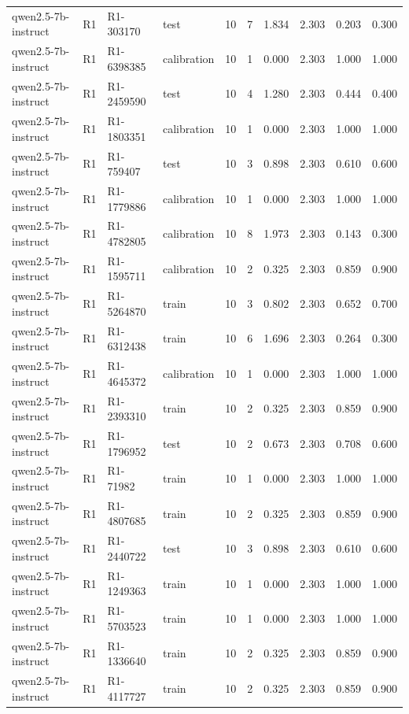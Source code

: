 \begin{table}
\begin{tabular}{llllrrrrrr}
qwen2.5-7b-instruct & R1 & R1-303170 & test & 10 & 7 & 1.834 & 2.303 & 0.203 & 0.300 \\
qwen2.5-7b-instruct & R1 & R1-6398385 & calibration & 10 & 1 & 0.000 & 2.303 & 1.000 & 1.000 \\
qwen2.5-7b-instruct & R1 & R1-2459590 & test & 10 & 4 & 1.280 & 2.303 & 0.444 & 0.400 \\
qwen2.5-7b-instruct & R1 & R1-1803351 & calibration & 10 & 1 & 0.000 & 2.303 & 1.000 & 1.000 \\
qwen2.5-7b-instruct & R1 & R1-759407 & test & 10 & 3 & 0.898 & 2.303 & 0.610 & 0.600 \\
qwen2.5-7b-instruct & R1 & R1-1779886 & calibration & 10 & 1 & 0.000 & 2.303 & 1.000 & 1.000 \\
qwen2.5-7b-instruct & R1 & R1-4782805 & calibration & 10 & 8 & 1.973 & 2.303 & 0.143 & 0.300 \\
qwen2.5-7b-instruct & R1 & R1-1595711 & calibration & 10 & 2 & 0.325 & 2.303 & 0.859 & 0.900 \\
qwen2.5-7b-instruct & R1 & R1-5264870 & train & 10 & 3 & 0.802 & 2.303 & 0.652 & 0.700 \\
qwen2.5-7b-instruct & R1 & R1-6312438 & train & 10 & 6 & 1.696 & 2.303 & 0.264 & 0.300 \\
qwen2.5-7b-instruct & R1 & R1-4645372 & calibration & 10 & 1 & 0.000 & 2.303 & 1.000 & 1.000 \\
qwen2.5-7b-instruct & R1 & R1-2393310 & train & 10 & 2 & 0.325 & 2.303 & 0.859 & 0.900 \\
qwen2.5-7b-instruct & R1 & R1-1796952 & test & 10 & 2 & 0.673 & 2.303 & 0.708 & 0.600 \\
qwen2.5-7b-instruct & R1 & R1-71982 & train & 10 & 1 & 0.000 & 2.303 & 1.000 & 1.000 \\
qwen2.5-7b-instruct & R1 & R1-4807685 & train & 10 & 2 & 0.325 & 2.303 & 0.859 & 0.900 \\
qwen2.5-7b-instruct & R1 & R1-2440722 & test & 10 & 3 & 0.898 & 2.303 & 0.610 & 0.600 \\
qwen2.5-7b-instruct & R1 & R1-1249363 & train & 10 & 1 & 0.000 & 2.303 & 1.000 & 1.000 \\
qwen2.5-7b-instruct & R1 & R1-5703523 & train & 10 & 1 & 0.000 & 2.303 & 1.000 & 1.000 \\
qwen2.5-7b-instruct & R1 & R1-1336640 & train & 10 & 2 & 0.325 & 2.303 & 0.859 & 0.900 \\
qwen2.5-7b-instruct & R1 & R1-4117727 & train & 10 & 2 & 0.325 & 2.303 & 0.859 & 0.900 \\

\end{tabular}
\end{table}

